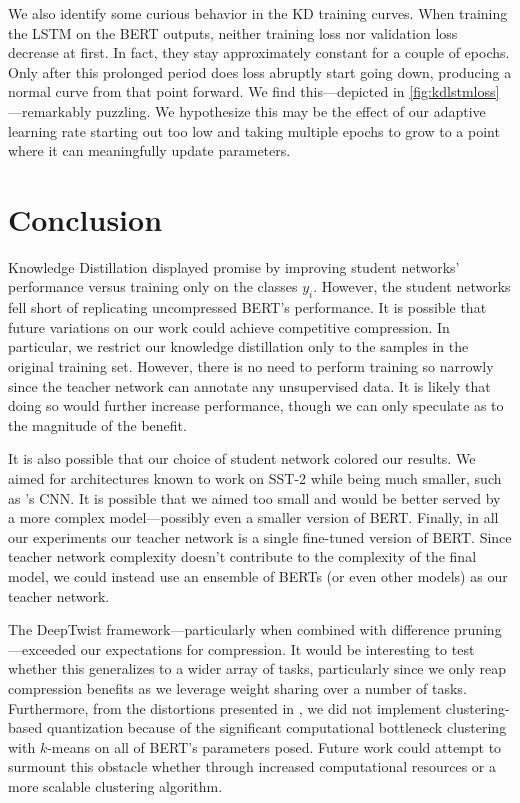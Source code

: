 \documentclass[10pt]{article}
\begin{document}
We also identify some curious behavior in the KD training curves. When training
the LSTM on the BERT outputs, neither training loss nor validation loss decrease
at first. In fact, they stay approximately constant for a couple of epochs. Only
after this prolonged period does loss abruptly start going down, producing a
normal curve from that point forward. We find this---depicted in
\cref{fig:kdlstmloss}---remarkably puzzling. We hypothesize this may be the
effect of our adaptive learning rate starting out too low and taking multiple
epochs to grow to a point where it can meaningfully update parameters. 

\section{Conclusion}

Knowledge Distillation displayed promise by improving student networks'
performance versus training only on the classes $y_i$. However, the student
networks fell short of replicating uncompressed BERT's performance. It is
possible that future variations on our work could achieve competitive
compression. In particular, we restrict our knowledge distillation only to the
samples in the original training set. However, there is no need to perform
training so narrowly since the teacher network can annotate any unsupervised
data. It is likely that doing so would further increase performance, though we
can only speculate as to the magnitude of the benefit.

It is also possible that our choice of student network colored our results. We
aimed for architectures known to work on SST-2 while being much smaller, such as
\citet{kim2014convolutional}'s CNN. It is possible that we aimed too small and
would be better served by a more complex model---possibly even a smaller version
of BERT. Finally, in all our experiments our teacher network is a single
fine-tuned version of BERT. Since teacher network complexity doesn't contribute
to the complexity of the final model, we could instead use an ensemble of BERTs
(or even other models) as our teacher network.

The DeepTwist framework---particularly when combined with difference
pruning---exceeded our expectations for compression. It would be interesting to
test whether this generalizes to a wider array of tasks, particularly since we
only reap compression benefits as we leverage weight sharing over a number of
tasks. Furthermore, from the distortions presented in \citet{lee2018deeptwist},
we did not implement clustering-based quantization because of the significant
computational bottleneck clustering with $k$-means on all of BERT's parameters
posed. Future work could attempt to surmount this obstacle whether through
increased computational resources or a more scalable clustering algorithm.
\end{document}
